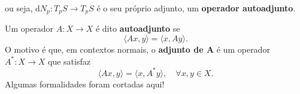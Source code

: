 \documentclass[../differential_geometry.tex]{subfiles}
\begin{document}
ou seja, \(\mathrm{d}N_p :T_pS\rightarrow T_pS\) é o seu próprio adjunto, um \textbf{operador autoadjunto}.
\begin{tcolorbox}[
		skin=enhanced,
		title=Lembrete!,
		after title={\hfill Operador autoadjunto},
		fonttitle=\bfseries,
		sharp corners=downhill,
		colframe=black,
		colbacktitle=yellow!75!white,
		colback=yellow!30,
		colbacklower=black,
		coltitle=black,
		drop large lifted shadow
	]
	Um operador \(A:X\rightarrow X\) é dito \textbf{autoadjunto} se
	\[
		\langle Ax, y \rangle = \langle x, Ay \rangle.
	\]
	O motivo é que, em contextos normais, o \textbf{adjunto de A} é um operador \(A^{*}:X\rightarrow X\) que satisfaz
	\[
		\langle Ax, y \rangle = \langle x, A^{*}y \rangle, \quad \forall x, y\in X.
	\]
	Algumas formalidades foram cortadas aqui!
\end{tcolorbox}
\end{document}
